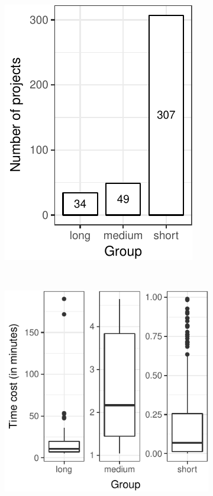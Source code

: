 \begin{figure}[ht]
    \centering
    \begin{subfigure}{0.24\textwidth}
        \centering
        \includegraphics[width=\textwidth]{plots/barplot-timecost.pdf}
        \caption{\label{fig:rq1-barplot}}
    \end{subfigure}%
    ~
    \begin{subfigure}{0.24\textwidth}
        \centering
        \includegraphics[width=\textwidth]{plots/boxplot-timecost.pdf}

\end{subfigure}
\end{figure}
